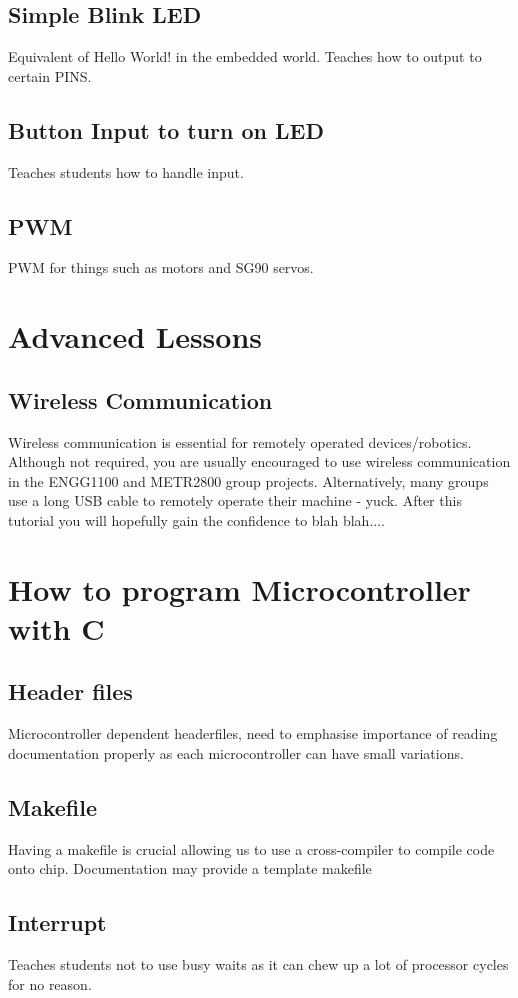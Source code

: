 \documentclass[a4paper,12pt]{report}
\begin{document}
\subsection*{Simple Blink LED}
Equivalent of Hello World! in the embedded world. Teaches how to output to certain PINS.
\subsection*{Button Input to turn on LED}
Teaches students how to handle input.
\subsection*{PWM}
PWM for things such as motors and SG90 servos.

\section*{Advanced Lessons}
\subsection*{Wireless Communication}
Wireless communication is essential for remotely operated devices/robotics. 
Although not required, you are usually encouraged to use wireless 
communication in the ENGG1100 and METR2800 group projects.
Alternatively, many groups use a long USB cable to remotely operate their 
machine - yuck. After this tutorial you will hopefully gain the confidence to blah blah....

\section*{How to program Microcontroller with C}
\subsection*{Header files}
Microcontroller dependent headerfiles, need to emphasise importance of reading documentation properly
as each microcontroller can have small variations.
\subsection*{Makefile}
Having a makefile is crucial allowing us to use a cross-compiler to compile code onto chip.
Documentation may provide a template makefile

\subsection*{Interrupt}
Teaches students not to use busy waits as it can chew up a lot of processor cycles for no reason.
\end{document}
